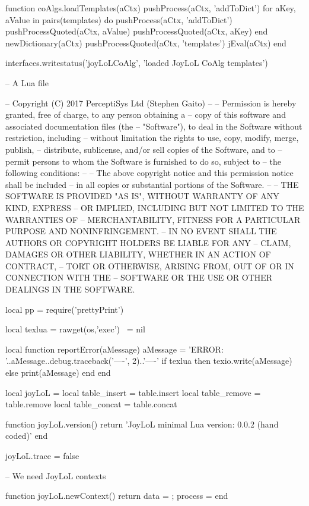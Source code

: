 function coAlgs.loadTemplates(aCtx)
  pushProcess(aCtx, 'addToDict')
  for aKey, aValue in pairs(templates) do
    pushProcess(aCtx, 'addToDict')
    pushProcessQuoted(aCtx, aValue)
    pushProcessQuoted(aCtx, aKey)
  end
  newDictionary(aCtx)
  pushProcessQuoted(aCtx, 'templates')
  jEval(aCtx)
end

interfaces.writestatus('joyLoLCoAlg', 'loaded JoyLoL CoAlg templates')
\stopLuaTemplate

\startMinJoyLoL
-- A Lua file

-- Copyright (C) 2017 PerceptiSys Ltd (Stephen Gaito)
--
-- Permission is hereby granted, free of charge, to any person obtaining a 
-- copy of this software and associated documentation files (the 
-- "Software"), to deal in the Software without restriction, including 
-- without limitation the rights to use, copy, modify, merge, publish, 
-- distribute, sublicense, and/or sell copies of the Software, and to 
-- permit persons to whom the Software is furnished to do so, subject to 
-- the following conditions:
--
-- The above copyright notice and this permission notice shall be included 
-- in all copies or substantial portions of the Software.
--
-- THE SOFTWARE IS PROVIDED "AS IS", WITHOUT WARRANTY OF ANY KIND, EXPRESS 
-- OR IMPLIED, INCLUDING BUT NOT LIMITED TO THE WARRANTIES OF 
-- MERCHANTABILITY, FITNESS FOR A PARTICULAR PURPOSE AND NONINFRINGEMENT. 
-- IN NO EVENT SHALL THE AUTHORS OR COPYRIGHT HOLDERS BE LIABLE FOR ANY 
-- CLAIM, DAMAGES OR OTHER LIABILITY, WHETHER IN AN ACTION OF CONTRACT, 
-- TORT OR OTHERWISE, ARISING FROM, OUT OF OR IN CONNECTION WITH THE 
-- SOFTWARE OR THE USE OR OTHER DEALINGS IN THE SOFTWARE.

local pp = require('prettyPrint')

local texlua = rawget(os,'exec')    ~= nil

local function reportError(aMessage)
  aMessage = 'ERROR: '..aMessage..debug.traceback('\n----', 2)..'\n----\n'
  if texlua then
    texio.write(aMessage)
  else
    print(aMessage)
  end
end

local joyLoL = { }
local table_insert = table.insert
local table_remove = table.remove
local table_concat = table.concat

function joyLoL.version()
  return 'JoyLoL minimal Lua version: 0.0.2 (hand coded)'
end

joyLoL.trace = false

-- We need JoyLoL contexts

function joyLoL.newContext()
  return { data = { }; process = { } }
end

